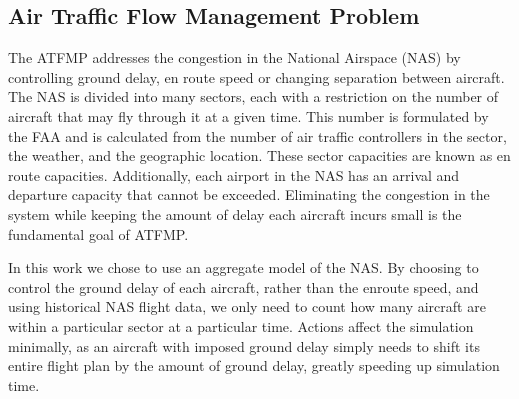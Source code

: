 \documentclass[letterpaper]{article}
\begin{document}
\subsection{Air Traffic Flow Management Problem}

The ATFMP addresses the congestion in the National Airspace (NAS) by controlling ground delay, en route speed or changing separation between aircraft. The NAS is divided into many sectors, each with a restriction on the number of aircraft that may fly through it at a given time. This number is formulated by the FAA and is calculated from the number of air traffic controllers in the sector, the weather, and the geographic location. These sector capacities are known as en route capacities. Additionally, each airport in the NAS has an arrival and departure capacity that cannot be exceeded. Eliminating the congestion in the system while keeping the amount of delay each aircraft incurs small is the fundamental goal of ATFMP. 


In this work we chose to use an aggregate model of the NAS. By choosing to control the ground delay of each aircraft, rather than the enroute speed, and using historical NAS flight data, we only need to count how many aircraft are within a particular sector at a particular time. Actions affect the simulation minimally, as an aircraft with imposed ground delay simply needs to shift its entire flight plan by the amount of ground delay, greatly speeding up simulation time.

\end{document}
